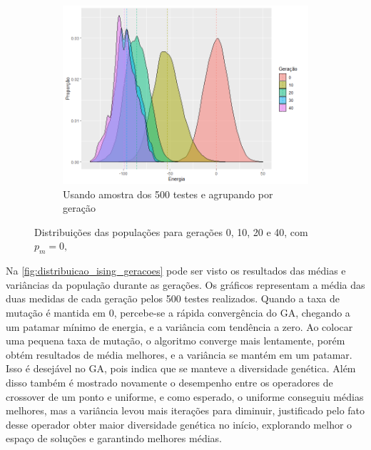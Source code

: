 \begin{figure}[h!]
\begin{subfigure}[b]{0.67\linewidth}
		\includegraphics[width=\linewidth]{imagens/Distribuicao_amostral_500_testes_sem_mut.png}
		\caption{Usando amostra dos 500 testes e agrupando por geração}
	\end{subfigure}
\caption{Distribuições das populações para gerações 0, 10, 20 e 40, com \(p_m=0,\)}
	\label{fig:distribuicao_ising_2}
\end{figure}

Na \autoref{fig:distribuicao_ising_geracoes} pode ser visto os resultados das médias e variâncias da população durante as gerações. Os gráficos representam a média das duas medidas de cada geração pelos 500 testes realizados. Quando a taxa de mutação é mantida em 0, percebe-se a rápida convergência do GA, chegando a um patamar mínimo de energia, e a variância com tendência a zero. Ao colocar uma pequena taxa de mutação, o algoritmo converge mais lentamente, porém obtém resultados de média melhores, e a variância se mantém em um patamar. Isso é desejável no GA, pois indica que se manteve a diversidade genética. Além disso também é mostrado novamente o desempenho entre os operadores de crossover de um ponto e uniforme, e como esperado, o uniforme conseguiu médias melhores, mas a variância levou mais iterações para diminuir, justificado pelo fato desse operador obter maior diversidade genética no início, explorando melhor o espaço de soluções e garantindo melhores médias.

